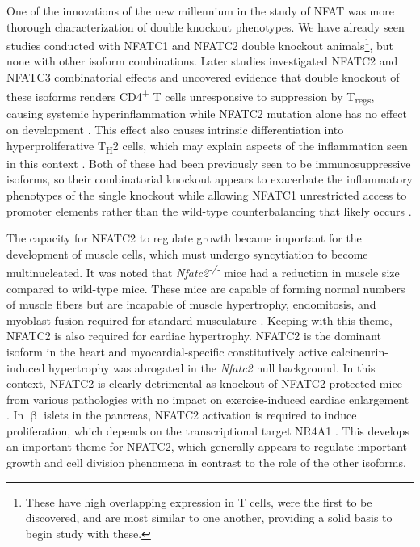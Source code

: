 One of the innovations of the new millennium in the study of NFAT was more thorough characterization of double knockout phenotypes. We have already seen studies conducted with NFATC1 and NFATC2 double knockout animals\footnote{These have high overlapping expression in T cells, were the first to be discovered, and are most similar to one another, providing a solid basis to begin study with these.}, but none with other isoform combinations. Later studies investigated NFATC2 and NFATC3 combinatorial effects and uncovered evidence that double knockout of these isoforms renders CD4\textsuperscript{+} T cells unresponsive to suppression by T\textsubscript{regs}, causing systemic hyperinflammation \citep{Bopp2005} while NFATC2 mutation alone has no effect on development \citep{CanteBarrett2007}. This effect also causes intrinsic differentiation into hyperproliferative T\textsubscript{H}2 cells, which may explain aspects of the inflammation seen in this context \citep{Rengarajan2002, Ranger1998b}. Both of these had been previously seen to be immunosuppressive isoforms, so their combinatorial knockout appears to exacerbate the inflammatory phenotypes of the single knockout \citep{Oukka1998, Hodge1996} while allowing NFATC1 unrestricted access to promoter elements rather than the wild\hyp{}type counterbalancing that likely occurs \citep{Ranger1998b}. 

The capacity for NFATC2 to regulate growth became important for the development of muscle cells, which must undergo syncytiation to become multinucleated. It was noted that \textit{Nfatc2\textsuperscript{\hyp{}/\hyp{}}} mice had a reduction in muscle size compared to wild\hyp{}type mice. These mice are capable of forming normal numbers of muscle fibers but are incapable of muscle hypertrophy, endomitosis, and myoblast fusion required for standard musculature \citep{Horsley2001, Pavlath2003, Schulze2005}. Keeping with this theme, NFATC2 is also required for cardiac hypertrophy. NFATC2 is the dominant isoform in the heart and myocardial\hyp{}specific constitutively active calcineurin\hyp{}induced hypertrophy was abrogated in the \textit{Nfatc2} null background. In this context, NFATC2 is clearly detrimental as knockout of NFATC2 protected mice from various pathologies with no impact on exercise\hyp{}induced cardiac enlargement \citep{Bourajjaj2008}. In $\upbeta$ islets in the pancreas, NFATC2 activation is required to induce proliferation, which depends on the transcriptional target NR4A1 \citep{Simonett2021}. This develops an important theme for NFATC2, which generally appears to regulate important growth and cell division phenomena in contrast to the role of the other isoforms.

